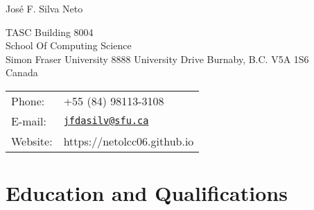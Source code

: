 \documentclass[letterpaper]{article}
\def\name{Jos\'e F. Silva Neto}
\renewenvironment{itemize}{
  \begin{list}{}{
      \setlength{\leftmargin}{1.5em}
    }
  }{
  \end{list}
}
\begin{document}
{\huge \name}


\vspace{0.25in}

\begin{minipage}{0.75\linewidth}
  TASC Building 8004 \\
  School Of Computing Science\\
  Simon Fraser University 8888 University Drive Burnaby, B.C. V5A 1S6\\
  Canada
\end{minipage}
\begin{minipage}{0.45\linewidth}
  \begin{tabular}{ll}
    Phone: & +55 (84) 98113-3108 \\
    E-mail: & \href{mailto:netolcc06@gmail.com}{\tt jfdasilv@sfu.ca} \\
    Website: & https://netolcc06.github.io
  \end{tabular}
\end{minipage}



\section*{Education and Qualifications}
\end{document}
